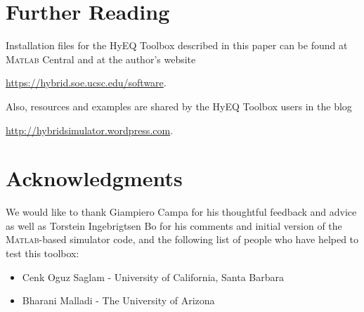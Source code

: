\documentclass{article}
\newcommand{\matlab}{\textsc{Matlab}}
\begin{document}
% 

% 

% 

% 


\section{Further Reading}
\label{sec:closingremarks}
\noindent Installation files for the HyEQ Toolbox described in this paper can be found 
at \matlab{} Central and at the author's website
\begin{center}
\url{https://hybrid.soe.ucsc.edu/software}.
\end{center}
Also, resources and examples are shared by the HyEQ Toolbox users in the blog
\begin{center}
\url{http://hybridsimulator.wordpress.com}.
\end{center}

\section{Acknowledgments}
\label{sec:acknowledgments}

We would like to thank Giampiero Campa for his thoughtful feedback 
and advice as well as Torstein Ingebrigtsen Bo for his comments 
and initial version of the \matlab{}-based simulator code, 
and the following list of people who have helped to test this toolbox:

\begin{itemize}
\item Cenk Oguz Saglam - University of California, Santa Barbara
\item Bharani Malladi - The University of Arizona
\end{itemize}

 
\label{sec:refs}


\end{document}
